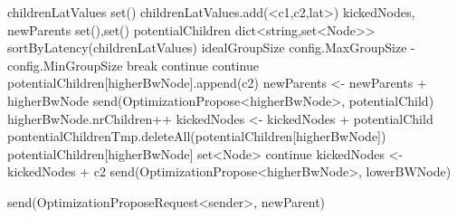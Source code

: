 \begin{algorithm}
\begin{algorithmic}[1]
            \State childrenLatValues \asdassign set()
                        \State childrenLatValues.add(<c1,c2,lat>)
                    \EndIf
                \EndFor
            \EndFor
            \State kickedNodes, newParents \asdassign set(),set()
            \State potentialChildren \asdassign dict<string,set<Node{>}{>}
            \State sortByLatency(childrenLatValues)
            \State idealGroupSize \asdassign config.MaxGroupSize - config.MinGroupSize
                    \State break
                \EndIf
                    \State continue
                \EndIf
                    \State continue
                \EndIf
                    \State potentialChildren[higherBwNode].append(c2)
                            \State newParents <- newParents + higherBwNode
                            \State send(OptimizationPropose<higherBwNode>, potentialChild)
                            \State higherBwNode.nrChildren++
                            \State kickedNodes <- kickedNodes + potentialChild
                        \EndFor
                            \State pontentialChildrenTmp.deleteAll(potentialChildren[higherBwNode])
                        \EndFor
                        \State potentialChildren[higherBwNode] \asdassign set<Node>
                        \State continue
                    \EndIf
                \EndIf
                \State kickedNodes <- kickedNodes + c2
                \State send(OptimizationPropose<higherBwNode>, lowerBWNode)
            \EndFor
        \asdend

                \State send(OptimizationProposeRequest<sender>, newParent)
            \EndIf
        \asdend


\end{algorithmic}
\end{algorithm}
